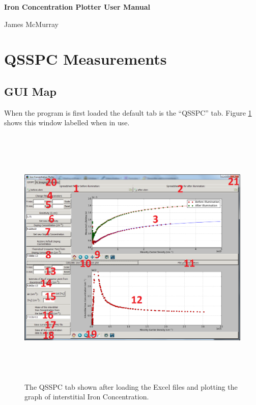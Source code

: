 \documentclass[final,a4paper,oneside,12pt]{article}
\begin{document}
\centerline{\Large \bf{Iron Concentration Plotter User Manual}}
\bigskip
\centerline{James McMurray}
\bigskip

\renewcommand{\labelenumi}{{\color{red} {\bf\arabic{enumi}}}}

\section{QSSPC Measurements}

\subsection{GUI Map}

When the program is first loaded the default tab is the ``QSSPC'' tab. Figure \ref{figure1} shows this window labelled when in use.

\begin{figure}[h]
\includegraphics[height=5in]{2mainscreen}
\caption{\label{figure1} The QSSPC tab shown after loading the Excel files and plotting the graph of interstitial Iron Concentration.}
\end{figure}
\end{document}
